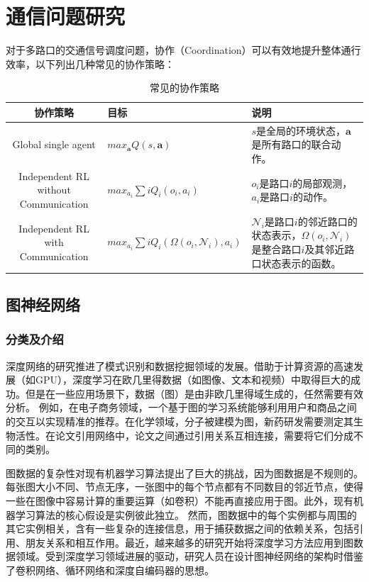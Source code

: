 
\section{通信问题研究}
对于多路口的交通信号调度问题，协作（Coordination）可以有效地提升整体通行效率，以下列出几种常见的协作策略：
\begin{table}[htb]
    \caption[协作策略]{常见的协作策略\label{tab:coordination}}
    \begin{tabular}{clp{}}
      \toprule
      协作策略 & 目标 & 说明 \\
      \midrule
      Global single agent & $max_{\mathbf{a}}Q(s, \mathbf{a})$ & $s$是全局的环境状态，$\mathbf{a}$是所有路口的联合动作。\\
      Independent RL without Communication & $max_{a_{i}}\sum{i}Q_{i}(o_i, a_i)$ & $o_i$是路口$i$的局部观测，$a_i$是路口$i$的动作。\\
      Independent RL with Communication & $max_{a_i}\sum{i}Q_i(\Omega(o_i, \mathcal{N}_i), a_i)$ &$\mathcal{N}_i$是路口$i$的邻近路口的状态表示，$\Omega(o_i, \mathcal{N}_i)$是整合路口$i$及其邻近路口状态表示的函数。\\
      \bottomrule
    \end{tabular}
\end{table}

\subsection{图神经网络}
\subsubsection{分类及介绍}
深度网络的研究推进了模式识别和数据挖掘领域的发展。借助于计算资源的高速发展（如GPU），深度学习在欧几里得数据（如图像、文本和视频）中取得巨大的成功。但是在一些应用场景下，数据（图）是由非欧几里得域生成的，任然需要有效分析。
例如，在电子商务领域，一个基于图的学习系统能够利用用户和商品之间的交互以实现精准的推荐。在化学领域，分子被建模为图，新药研发需要测定其生物活性。在论文引用网络中，论文之间通过引用关系互相连接，需要将它们分成不同的类别。

图数据的复杂性对现有机器学习算法提出了巨大的挑战，因为图数据是不规则的。每张图大小不同、节点无序，一张图中的每个节点都有不同数目的邻近节点，使得一些在图像中容易计算的重要运算（如卷积）不能再直接应用于图。此外，现有机器学习算法的核心假设是实例彼此独立。
然而，图数据中的每个实例都与周围的其它实例相关，含有一些复杂的连接信息，用于捕获数据之间的依赖关系，包括引用、朋友关系和相互作用。最近，越来越多的研究开始将深度学习方法应用到图数据领域。受到深度学习领域进展的驱动，研究人员在设计图神经网络的架构时借鉴了卷积网络、循环网络和深度自编码器的思想。

